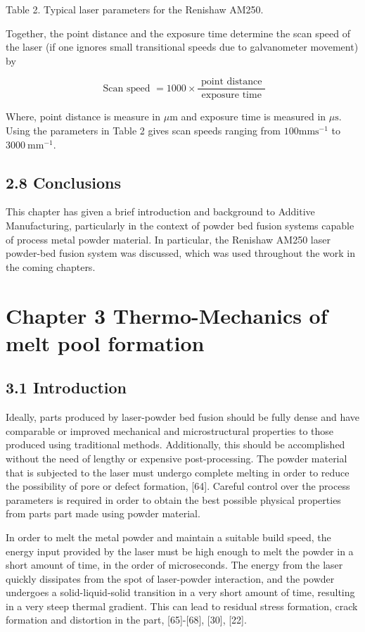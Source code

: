 \documentclass[10pt]{article}
\begin{document}
Table 2. Typical laser parameters for the Renishaw AM250.

Together, the point distance and the exposure time determine the scan speed of the laser (if one ignores small transitional speeds due to galvanometer movement) by


\begin{equation*}
\text { Scan speed }=1000 \times \frac{\text { point distance }}{\text { exposure time }} \tag{2}
\end{equation*}


Where, point distance is measure in $\mu \mathrm{m}$ and exposure time is measured in $\mu \mathrm{s}$. Using the parameters in Table 2 gives scan speeds ranging from $100 \mathrm{mms}^{-1}$ to $3000 \mathrm{~mm}^{-1}$.

\subsection*{2.8 Conclusions}
This chapter has given a brief introduction and background to Additive Manufacturing, particularly in the context of powder bed fusion systems capable of process metal powder material. In particular, the Renishaw AM250 laser powder-bed fusion system was discussed, which was used throughout the work in the coming chapters.

\section*{Chapter 3 Thermo-Mechanics of melt pool formation}
\subsection*{3.1 Introduction}
Ideally, parts produced by laser-powder bed fusion should be fully dense and have comparable or improved mechanical and microstructural properties to those produced using traditional methods. Additionally, this should be accomplished without the need of lengthy or expensive post-processing. The powder material that is subjected to the laser must undergo complete melting in order to reduce the possibility of pore or defect formation, [64]. Careful control over the process parameters is required in order to obtain the best possible physical properties from parts part made using powder material.

In order to melt the metal powder and maintain a suitable build speed, the energy input provided by the laser must be high enough to melt the powder in a short amount of time, in the order of microseconds. The energy from the laser quickly dissipates from the spot of laser-powder interaction, and the powder undergoes a solid-liquid-solid transition in a very short amount of time, resulting in a very steep thermal gradient. This can lead to residual stress formation, crack formation and distortion in the part, [65]-[68], [30], [22].
\end{document}
